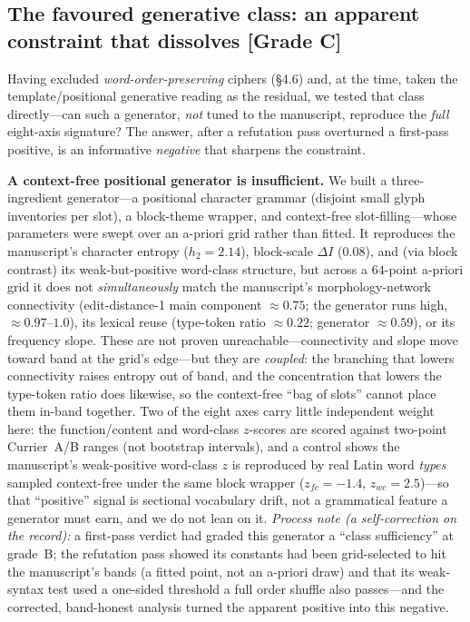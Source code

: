 \documentclass[11pt]{article}
\newcommand{\grade}[1]{{\small\textbf{[#1]}}}
\begin{document}
\subsection{The favoured generative class: an apparent constraint that dissolves \grade{Grade C}}
Having excluded \emph{word-order-preserving} ciphers (\S4.6) and, at the time, taken the
template/positional generative reading as the residual, we tested that class
directly---can such a generator, \emph{not}
tuned to the manuscript, reproduce the \emph{full} eight-axis signature? The answer,
after a refutation pass overturned a first-pass positive, is an informative
\emph{negative} that sharpens the constraint.

\textbf{A context-free positional generator is insufficient.} We built a three-ingredient
generator---a positional character grammar (disjoint small glyph inventories per slot), a
block-theme wrapper, and context-free slot-filling---whose parameters were swept over an
a-priori grid rather than fitted. It reproduces the manuscript's character entropy
($h_2=2.14$), block-scale $\Delta I$ ($0.08$), and (via block contrast) its
weak-but-positive word-class structure, but across a $64$-point a-priori grid it does not
\emph{simultaneously} match the manuscript's morphology-network connectivity
(edit-distance-1 main component $\approx 0.75$; the generator runs high, $\approx
0.97$--$1.0$), its lexical reuse (type-token ratio $\approx 0.22$; generator $\approx
0.59$), or its frequency slope. These are not proven unreachable---connectivity and slope
move toward band at the grid's edge---but they are \emph{coupled}: the branching that
lowers connectivity raises entropy out of band, and the concentration that lowers the
type-token ratio does likewise, so the context-free ``bag of slots'' cannot place them
in-band together. Two of the eight axes carry little independent weight here: the
function/content and word-class $z$-scores are scored against two-point Currier~A/B ranges
(not bootstrap intervals), and a control shows the manuscript's weak-positive word-class
$z$ is reproduced by real Latin word \emph{types} sampled context-free under the same
block wrapper ($z_{fc}=-1.4$, $z_{wc}=2.5$)---so that ``positive'' signal is sectional
vocabulary drift, not a grammatical feature a generator must earn, and we do not lean on
it. \emph{Process note (a self-correction on the record):} a first-pass verdict had
graded this generator a ``class sufficiency'' at grade~B; the refutation pass showed its
constants had been grid-selected to hit the manuscript's bands (a fitted point, not an
a-priori draw) and that its weak-syntax test used a one-sided threshold a full order
shuffle also passes---and the corrected, band-honest analysis turned the apparent
positive into this negative.
\end{document}
